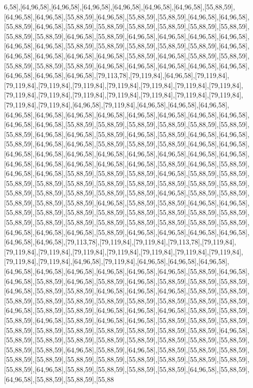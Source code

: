 6,58],[64,96,58],[64,96,58],[64,96,58],[64,96,58],[64,96,58],[64,96,58],[55,88,59],[64,96,58],[64,96,58],[55,88,59],[64,96,58],[55,88,59],[55,88,59],[64,96,58],[64,96,58],[55,88,59],[64,96,58],[55,88,59],[55,88,59],[55,88,59],[55,88,59],[55,88,59],[55,88,59],[55,88,59],[55,88,59],[64,96,58],[55,88,59],[64,96,58],[64,96,58],[64,96,58],[64,96,58],[64,96,58],[64,96,58],[55,88,59],[55,88,59],[55,88,59],[55,88,59],[55,88,59],[64,96,58],[64,96,58],[64,96,58],[64,96,58],[64,96,58],[55,88,59],[64,96,58],[55,88,59],[55,88,59],[55,88,59],[55,88,59],[55,88,59],[64,96,58],[64,96,58],[64,96,58],[64,96,58],[64,96,58],[64,96,58],[64,96,58],[64,96,58],[79,113,78],[79,119,84],[64,96,58],[79,119,84],[79,119,84],[79,119,84],[79,119,84],[79,119,84],[79,119,84],[79,119,84],[79,119,84],[79,119,84],[79,119,84],[79,119,84],[79,119,84],[79,119,84],[79,119,84],[79,119,84],[79,119,84],[79,119,84],[64,96,58],[79,119,84],[64,96,58],[64,96,58],[64,96,58],[64,96,58],[64,96,58],[64,96,58],[64,96,58],[64,96,58],[64,96,58],[64,96,58],[64,96,58],[64,96,58],[64,96,58],[55,88,59],[55,88,59],[55,88,59],[55,88,59],[55,88,59],[55,88,59],[55,88,59],[64,96,58],[64,96,58],[55,88,59],[64,96,58],[55,88,59],[64,96,58],[64,96,58],[55,88,59],[64,96,58],[64,96,58],[55,88,59],[55,88,59],[55,88,59],[64,96,58],[64,96,58],[64,96,58],[64,96,58],[64,96,58],[64,96,58],[64,96,58],[64,96,58],[64,96,58],[64,96,58],[64,96,58],[64,96,58],[64,96,58],[64,96,58],[64,96,58],[55,88,59],[64,96,58],[55,88,59],[64,96,58],[64,96,58],[55,88,59],[55,88,59],[55,88,59],[64,96,58],[55,88,59],[55,88,59],[55,88,59],[55,88,59],[55,88,59],[55,88,59],[55,88,59],[55,88,59],[55,88,59],[55,88,59],[55,88,59],[55,88,59],[55,88,59],[55,88,59],[55,88,59],[64,96,58],[55,88,59],[55,88,59],[55,88,59],[55,88,59],[55,88,59],[64,96,58],[55,88,59],[55,88,59],[64,96,58],[64,96,58],[55,88,59],[55,88,59],[55,88,59],[55,88,59],[55,88,59],[55,88,59],[55,88,59],[55,88,59],[55,88,59],[55,88,59],[55,88,59],[55,88,59],[55,88,59],[55,88,59],[55,88,59],[55,88,59],[64,96,58],[64,96,58],[64,96,58],[55,88,59],[64,96,58],[64,96,58],[64,96,58],[64,96,58],[64,96,58],[64,96,58],[79,113,78],[79,119,84],[79,119,84],[79,113,78],[79,119,84],[79,119,84],[79,119,84],[79,119,84],[79,119,84],[79,119,84],[79,119,84],[79,119,84],[79,119,84],[79,119,84],[64,96,58],[79,119,84],[64,96,58],[64,96,58],[64,96,58],[64,96,58],[64,96,58],[64,96,58],[64,96,58],[64,96,58],[64,96,58],[55,88,59],[64,96,58],[64,96,58],[55,88,59],[64,96,58],[55,88,59],[64,96,58],[55,88,59],[55,88,59],[55,88,59],[64,96,58],[55,88,59],[55,88,59],[64,96,58],[64,96,58],[64,96,58],[55,88,59],[55,88,59],[55,88,59],[55,88,59],[55,88,59],[55,88,59],[55,88,59],[55,88,59],[55,88,59],[55,88,59],[64,96,58],[55,88,59],[55,88,59],[64,96,58],[64,96,58],[64,96,58],[55,88,59],[55,88,59],[55,88,59],[64,96,58],[55,88,59],[64,96,58],[64,96,58],[55,88,59],[55,88,59],[55,88,59],[55,88,59],[55,88,59],[55,88,59],[55,88,59],[55,88,59],[55,88,59],[55,88,59],[64,96,58],[55,88,59],[55,88,59],[55,88,59],[55,88,59],[55,88,59],[55,88,59],[55,88,59],[55,88,59],[55,88,59],[55,88,59],[64,96,58],[55,88,59],[64,96,58],[55,88,59],[55,88,59],[55,88,59],[55,88,59],[55,88,59],[55,88,59],[55,88,59],[55,88,59],[55,88,59],[55,88,59],[55,88,59],[55,88,59],[64,96,58],[55,88,59],[55,88,59],[55,88,59],[55,88,59],[64,96,58],[55,88,59],[64,96,58],[55,88,59],[55,88,59],[55,88